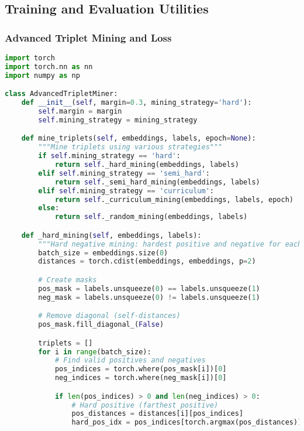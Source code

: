 \subsection{Training and Evaluation Utilities}

\subsubsection{Advanced Triplet Mining and Loss}

\begin{lstlisting}[language=Python, caption=Advanced Triplet Mining Implementation]
import torch
import torch.nn as nn
import numpy as np

class AdvancedTripletMiner:
    def __init__(self, margin=0.3, mining_strategy='hard'):
        self.margin = margin
        self.mining_strategy = mining_strategy

    def mine_triplets(self, embeddings, labels, epoch=None):
        """Mine triplets using various strategies"""
        if self.mining_strategy == 'hard':
            return self._hard_mining(embeddings, labels)
        elif self.mining_strategy == 'semi_hard':
            return self._semi_hard_mining(embeddings, labels)
        elif self.mining_strategy == 'curriculum':
            return self._curriculum_mining(embeddings, labels, epoch)
        else:
            return self._random_mining(embeddings, labels)

    def _hard_mining(self, embeddings, labels):
        """Hard negative mining: hardest positive and negative for each anchor"""
        batch_size = embeddings.size(0)
        distances = torch.cdist(embeddings, embeddings, p=2)

        # Create masks
        pos_mask = labels.unsqueeze(0) == labels.unsqueeze(1)
        neg_mask = labels.unsqueeze(0) != labels.unsqueeze(1)

        # Remove diagonal (self-distances)
        pos_mask.fill_diagonal_(False)

        triplets = []
        for i in range(batch_size):
            # Find valid positives and negatives
            pos_indices = torch.where(pos_mask[i])[0]
            neg_indices = torch.where(neg_mask[i])[0]

            if len(pos_indices) > 0 and len(neg_indices) > 0:
                # Hard positive (farthest positive)
                pos_distances = distances[i][pos_indices]
                hard_pos_idx = pos_indices[torch.argmax(pos_distances)]


\end{lstlisting}
